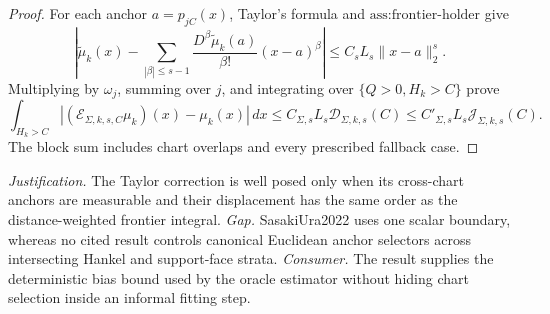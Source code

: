 \documentclass{article}
\begin{document}
\begin{proof}
For each anchor \(a=p_{jC}(x)\), Taylor's formula and \(\text{ass:frontier-holder}\) give
\[
\left|\widetilde\mu_k(x)-
\sum_{|\beta|\le s-1}
\frac{D^\beta\widetilde\mu_k(a)}{\beta!}(x-a)^\beta\right|
\le C_sL_s\|x-a\|_2^s.
\]
Multiplying by \(\omega_j\), summing over \(j\), and integrating over \(\{Q>0,H_k>C\}\) prove
\[
\int_{H_k>C}|(\mathcal E_{\Sigma,k,s,C}\mu_k)(x)-\mu_k(x)|\,dx
\le C_{\Sigma,s}L_s\mathcal D_{\Sigma,k,s}(C)
\le C'_{\Sigma,s}L_s\mathcal J_{\Sigma,k,s}(C).
\]
The block sum includes chart overlaps and every prescribed fallback case.
\end{proof}
\par\smallskip\noindent \textit{Justification.} The Taylor correction is well posed only when its cross-chart anchors are measurable and their displacement has the same order as the distance-weighted frontier integral. \textit{Gap.} SasakiUra2022 uses one scalar boundary, whereas no cited result controls canonical Euclidean anchor selectors across intersecting Hankel and support-face strata. \textit{Consumer.} The result supplies the deterministic bias bound used by the oracle estimator without hiding chart selection inside an informal fitting step.
\end{document}
